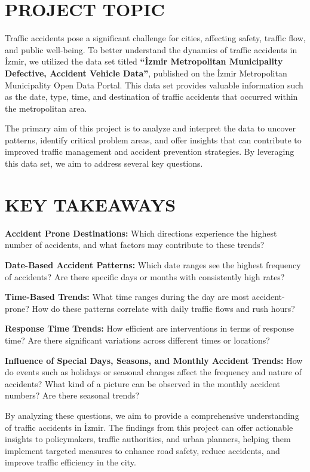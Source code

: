 \documentclass[
  11pt,
  a4paper,
  DIV=11,
  numbers=noendperiod]{scrartcl}
\begin{document}
\section{\texorpdfstring{\textbf{PROJECT
TOPIC}}{PROJECT TOPIC}}\label{project-topic}

Traffic accidents pose a significant challenge for cities, affecting
safety, traffic flow, and public well-being. To better understand the
dynamics of traffic accidents in İzmir, we utilized the data set titled
\textbf{``İzmir Metropolitan Municipality Defective, Accident Vehicle
Data''}, published on the İzmir Metropolitan Municipality Open Data
Portal. This data set provides valuable information such as the date,
type, time, and destination of traffic accidents that occurred within
the metropolitan area.

The primary aim of this project is to analyze and interpret the data to
uncover patterns, identify critical problem areas, and offer insights
that can contribute to improved traffic management and accident
prevention strategies. By leveraging this data set, we aim to address
several key questions.

\section{\texorpdfstring{\textbf{KEY
TAKEAWAYS}}{KEY TAKEAWAYS}}\label{key-takeaways}

\textbf{Accident Prone Destinations:} Which directions experience the
highest number of accidents, and what factors may contribute to these
trends?

\textbf{Date-Based Accident Patterns:} Which date ranges see the highest
frequency of accidents? Are there specific days or months with
consistently high rates?

\textbf{Time-Based Trends:} What time ranges during the day are most
accident-prone? How do these patterns correlate with daily traffic flows
and rush hours?

\textbf{Response Time Trends:} How efficient are interventions in terms
of response time? Are there significant variations across different
times or locations?

\textbf{Influence of Special Days, Seasons, and Monthly Accident
Trends:} How do events such as holidays or seasonal changes affect the
frequency and nature of accidents? What kind of a picture can be
observed in the monthly accident numbers? Are there seasonal trends?

By analyzing these questions, we aim to provide a comprehensive
understanding of traffic accidents in İzmir. The findings from this
project can offer actionable insights to policymakers, traffic
authorities, and urban planners, helping them implement targeted
measures to enhance road safety, reduce accidents, and improve traffic
efficiency in the city.
\end{document}

